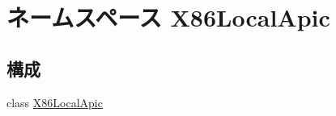 \hypertarget{namespaceX86LocalApic}{
\section{ネームスペース X86LocalApic}
\label{namespaceX86LocalApic}
}
\subsection*{構成}
\begin{DoxyCompactItemize}
\item 
class \hyperlink{classX86LocalApic_1_1X86LocalApic}{X86LocalApic}
\end{DoxyCompactItemize}
